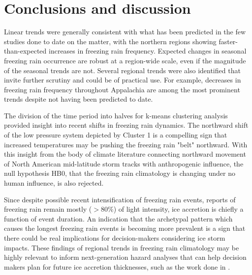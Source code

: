 \documentclass[twocol]{ametsoc}
\begin{document}
\section{Conclusions and discussion}
Linear trends were generally consistent with what has been predicted in the few studies done to date on the matter, with the northern regions showing faster-than-expected increases in freezing rain frequency. Expected changes in seasonal freezing rain occurrence are robust at a region-wide scale, even if the magnitude of the seasonal trends are not. Several regional trends were also identified that invite further scrutiny and could be of practical use. For example, decreases in freezing rain frequency throughout Appalachia are among the most prominent trends despite not having been predicted to date. 

The division of the time period into halves for k-means clustering analysis provided insight into recent shifts in freezing rain dynamics. The northward shift of the low pressure system depicted by Cluster 1 is a compelling sign that increased temperatures may be pushing the freezing rain "belt" northward. With this insight from the body of climate literature connecting northward movement of North American mid-latitude storm tracks with anthropogenic influence, the null hypothesis HB$0$, that the freezing rain climatology is changing under no human influence, is also rejected. 

Since despite possible recent intensification of freezing rain events, reports of freezing rain remain mostly ($>$80\%) of light intensity, ice accretion is chiefly a function of event duration. An indication that the archetypal pattern which causes the longest freezing rain events is becoming more prevalent is a sign that there could be real implications for decision-makers considering ice storm impacts. These findings of regional trends in freezing rain climatology may be highly relevant to inform next-generation hazard analyses that can help decision makers plan for future ice accretion thicknesses, such as the work done in \citet{erfani2014aggregated}.
\end{document}
